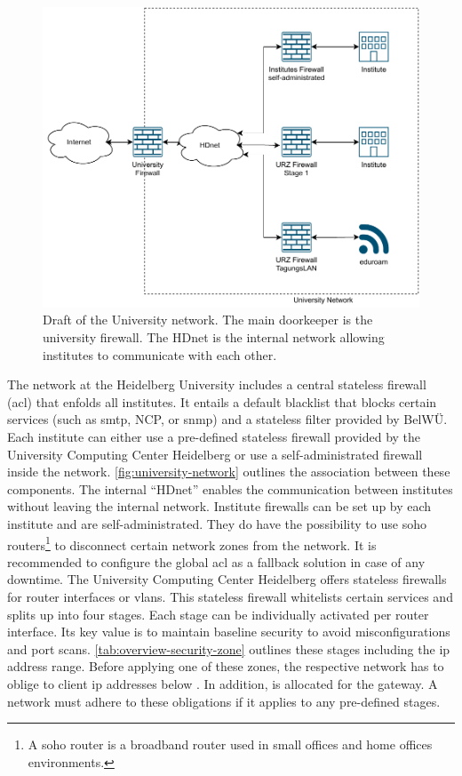 \begin{figure}
    \centering
    \includegraphics[width=\textwidth]{figures/university-network.pdf}
    \caption[Draft of the University network]{
        Draft of the University network.
        The main doorkeeper is the university firewall.
        The HDnet is the internal network allowing institutes to communicate with each other.
    }
    \label{fig:university-network}
\end{figure}

The network at the Heidelberg University includes a central stateless firewall (\ac{acl}) that enfolds all institutes.
It entails a default blacklist that blocks certain services (such as \ac{smtp}, NCP, or \ac{snmp}) and a stateless filter provided by BelWÜ.
Each institute can either use a pre-defined stateless firewall provided by the University Computing Center Heidelberg or use a self-administrated firewall inside the network.
\autoref{fig:university-network} outlines the association between these components.
The internal \enquote{HDnet} enables the communication between institutes without leaving the internal network.
Institute firewalls can be set up by each institute and are self-administrated.
They do have the possibility to use \acs{soho} routers\footnote{A \acl{soho} router is a broadband router used in small offices and home offices environments.} to disconnect certain network zones from the network.
It is recommended to configure the global \ac{acl} as a fallback solution in case of any downtime.
The University Computing Center Heidelberg offers stateless firewalls for router interfaces or \acp{vlan}.
This stateless firewall whitelists certain services and splits up into four stages.
Each stage can be individually activated per router interface.
Its key value is to maintain baseline security to avoid misconfigurations and port scans.
\autoref{tab:overview-security-zone} outlines these stages including the \ac{ip} address range.
Before applying one of these zones, the respective network has to oblige to client \ac{ip} addresses below .
In addition,  is allocated for the gateway.
A network must adhere to these obligations if it applies to any pre-defined stages.

